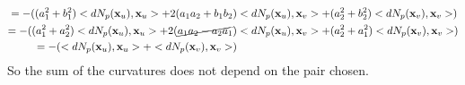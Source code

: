\documentclass[12pt,letterpaper]{hmcpset}
\begin{document}
\begin{solution}
\begin{align*}
                              = -((a_1^2 + b_1^2)<dN_p(\mathbf{x}_u), \mathbf{x}_u> + 
                                 2(a_1a_2 + b_1b_2)&<dN_p(\mathbf{x}_u), \mathbf{x}_v> + 
                                                     (a_2^2 + b_2^2)<dN_p(\mathbf{x}_v), \mathbf{x}_v>) \\
  = -((a_1^2 + a_2^2)<dN_p(\mathbf{x}_u), \mathbf{x}_u> + 
                                 2(\cancel{a_1a_2 - a_2a_1})&<dN_p(\mathbf{x}_u), \mathbf{x}_v> + 
                                                     (a_2^2 + a_1^2)<dN_p(\mathbf{x}_v), \mathbf{x}_v>) \\
 = -(<dN_p(\mathbf{x}_u), \mathbf{x}_u> + <dN_p(\mathbf{x}_v), \mathbf{x}_v>)
\end{align*}
So the sum of the curvatures does not depend on the pair chosen. 
\end{solution}
\end{document}
